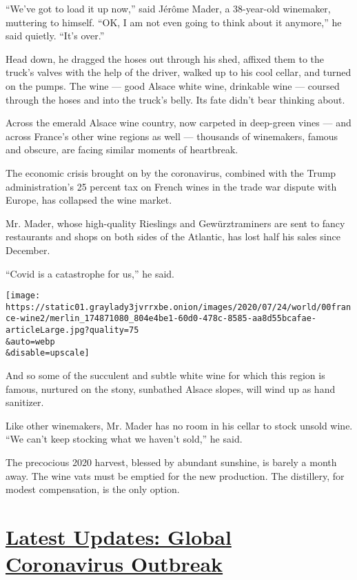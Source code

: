 ``We've got to load it up now,'' said Jérôme Mader, a 38-year-old
winemaker, muttering to himself. ``OK, I am not even going to think
about it anymore,'' he said quietly. ``It's over.''

Head down, he dragged the hoses out through his shed, affixed them to
the truck's valves with the help of the driver, walked up to his cool
cellar, and turned on the pumps. The wine --- good Alsace white wine,
drinkable wine --- coursed through the hoses and into the truck's belly.
Its fate didn't bear thinking about.

Across the emerald Alsace wine country, now carpeted in deep-green vines
--- and across France's other wine regions as well --- thousands of
winemakers, famous and obscure, are facing similar moments of
heartbreak.

The economic crisis brought on by the coronavirus, combined with the
Trump administration's 25 percent tax on French wines in the trade war
dispute with Europe, has collapsed the wine market.

Mr. Mader, whose high-quality Rieslings and Gewürztraminers are sent to
fancy restaurants and shops on both sides of the Atlantic, has lost half
his sales since December.

``Covid is a catastrophe for us,'' he said.

\texttt{[image: https://static01.graylady3jvrrxbe.onion/images/2020/07/24/world/00france-wine2/merlin\_174871080\_804e4be1-60d0-478c-8585-aa8d55bcafae-articleLarge.jpg?quality=75\\\&auto=webp\\\&disable=upscale]}

And so some of the succulent and subtle white wine for which this region
is famous, nurtured on the stony, sunbathed Alsace slopes, will wind up
as hand sanitizer.

Like other winemakers, Mr. Mader has no room in his cellar to stock
unsold wine. ``We can't keep stocking what we haven't sold,'' he said.

The precocious 2020 harvest, blessed by abundant sunshine, is barely a
month away. The wine vats must be emptied for the new production. The
distillery, for modest compensation, is the only option.

\hypertarget{latest-updates-global-coronavirus-outbreak}{%
\section{\texorpdfstring{\href{https://www.nytimes3xbfgragh.onion/2020/08/04/world/coronavirus-cases.html?action=click\&pgtype=Article\&state=default\&region=MAIN_CONTENT_1\&context=storylines_live_updates}{Latest
Updates: Global Coronavirus
Outbreak}}{Latest Updates: Global Coronavirus Outbreak}}\label{latest-updates-global-coronavirus-outbreak}}

